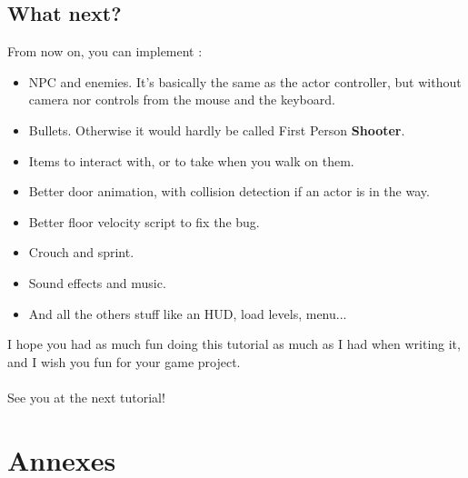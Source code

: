 \documentclass[10pt,a4paper]{article}
\begin{document}
\subsection{What next?}
From now on, you can implement :
\begin{itemize}
\item NPC and enemies. It's basically the same as the actor controller, but without camera nor controls from the mouse and the keyboard.
\item Bullets. Otherwise it would hardly be called First Person \textbf{Shooter}.
\item Items to interact with, or to take when you walk on them.
\item Better door animation, with collision detection if an actor is in the way.
\item Better floor velocity script to fix the bug.
\item Crouch and sprint.
\item Sound effects and music.
\item And all the others stuff like an HUD, load levels, menu...
\end{itemize}
I hope you had as much fun doing this tutorial as much as I had when writing it, and I wish you fun for your game project.\\
\\
See you at the next tutorial!
\section{Annexes}
\end{document}
